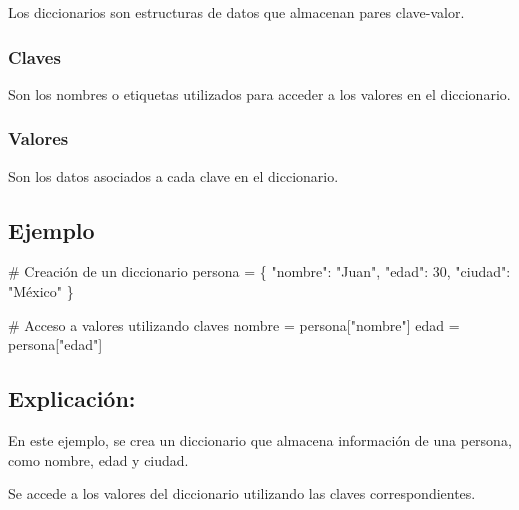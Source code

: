 \documentclass[
  a4paper,
  DIV=11,
  numbers=noendperiod,
  onepage,
  openany]{scrreprt}
\newenvironment{Shaded}{\begin{snugshade}}{\end{snugshade}}
\newcommand{\CommentTok}[1]{\textcolor[rgb]{0.37,0.37,0.37}{#1}}
\newcommand{\DecValTok}[1]{\textcolor[rgb]{0.68,0.00,0.00}{#1}}
\newcommand{\NormalTok}[1]{\textcolor[rgb]{0.00,0.23,0.31}{#1}}
\newcommand{\OperatorTok}[1]{\textcolor[rgb]{0.37,0.37,0.37}{#1}}
\newcommand{\StringTok}[1]{\textcolor[rgb]{0.13,0.47,0.30}{#1}}
\begin{document}
Los diccionarios son estructuras de datos que almacenan pares
clave-valor.

\subsubsection{Claves}\label{claves}

Son los nombres o etiquetas utilizados para acceder a los valores en el
diccionario.

\subsubsection{Valores}\label{valores}

Son los datos asociados a cada clave en el diccionario.

\subsection{Ejemplo}\label{ejemplo-5}

\begin{Shaded}
\begin{Highlighting}[]
\CommentTok{\# Creación de un diccionario}
\NormalTok{persona }\OperatorTok{=}\NormalTok{ \{}
    \StringTok{"nombre"}\NormalTok{: }\StringTok{"Juan"}\NormalTok{,}
    \StringTok{"edad"}\NormalTok{: }\DecValTok{30}\NormalTok{,}
    \StringTok{"ciudad"}\NormalTok{: }\StringTok{"México"}
\NormalTok{\}}

\CommentTok{\# Acceso a valores utilizando claves}
\NormalTok{nombre }\OperatorTok{=}\NormalTok{ persona[}\StringTok{"nombre"}\NormalTok{]}
\NormalTok{edad }\OperatorTok{=}\NormalTok{ persona[}\StringTok{"edad"}\NormalTok{]}
\end{Highlighting}
\end{Shaded}

\subsection{Explicación:}\label{explicaciuxf3n-10}

En este ejemplo, se crea un diccionario que almacena información de una
persona, como nombre, edad y ciudad.

Se accede a los valores del diccionario utilizando las claves
correspondientes.
\end{document}
